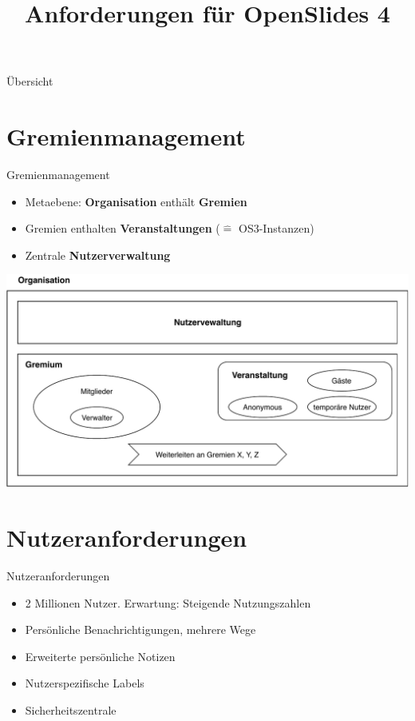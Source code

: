 \documentclass[10pt]{beamer}
\title{Anforderungen für OpenSlides 4}
\author{}
\date{}
\begin{document}
\begin{frame}[plain]
    \maketitle
\end{frame}

\begin{frame}{Übersicht}
	\tableofcontents
\end{frame}

\section{Gremienmanagement}
\begin{frame}{Gremienmanagement}
	\begin{itemize}
		\item Metaebene: \textbf{Organisation} enthält \textbf{Gremien}
		\item Gremien enthalten \textbf{Veranstaltungen} ($\hat{=}$ OS3-Instanzen)
		\item Zentrale \textbf{Nutzerverwaltung}
	\end{itemize}
	\includegraphics[scale=0.55]{organisation}
\end{frame}

\section{Nutzeranforderungen}
\begin{frame}{Nutzeranforderungen}
	\begin{itemize}
		\item<+-> 2 Millionen Nutzer. Erwartung: Steigende Nutzungszahlen
		\item<+-> Persönliche Benachrichtigungen, mehrere Wege
		\item<+-> Erweiterte persönliche Notizen
		\item<+-> Nutzerspezifische Labels
		\item<+-> Sicherheitszentrale
	\end{itemize}
\end{frame}
\end{document}
